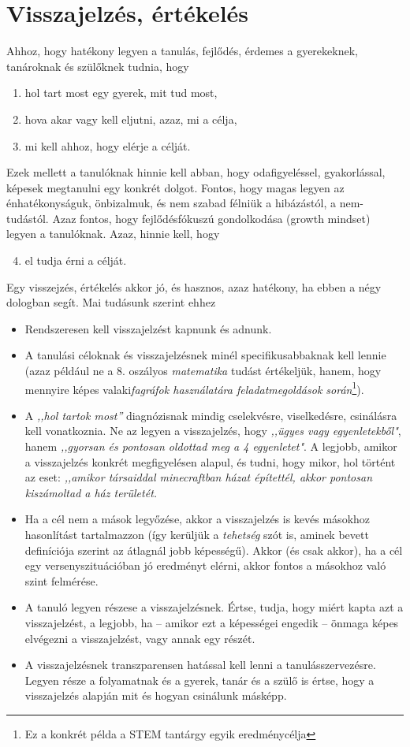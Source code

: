 \section{Visszajelzés, értékelés}
\label{sec:ertekeles}
Ahhoz, hogy hatékony legyen a tanulás, fejlődés, érdemes a gyerekeknek, tanároknak és szülőknek tudnia, hogy
\begin{enumerate}
\item hol tart most egy gyerek, mit tud most,
\item hova akar vagy kell eljutni, azaz, mi a célja,
\item mi kell ahhoz, hogy elérje a célját.
\end{enumerate}
Ezek mellett a tanulóknak hinnie kell abban, hogy odafigyeléssel, gyakorlással, képesek megtanulni egy konkrét dolgot. Fontos, hogy magas legyen az énhatékonyságuk, önbizalmuk, és nem szabad félniük a hibázástól, a nem-tudástól. Azaz fontos, hogy fejlődésfókuszú gondolkodása (growth mindset)\cite{growthmindset} legyen a tanulóknak. Azaz, hinnie kell, hogy
\begin{enumerate}
  \setcounter{enumi}{3}
  \item el tudja érni a célját.
\end{enumerate}

Egy visszejzés, értékelés akkor jó, és hasznos, azaz hatékony, ha ebben a négy dologban segít. Mai tudásunk szerint ehhez
\begin{itemize}
\item Rendszeresen kell visszajelzést kapnunk és adnunk.
\item A tanulási céloknak és visszajelzésnek minél specifikusabbaknak kell lennie (azaz például ne a 8. oszályos \emph{matematika} tudást értékeljük, hanem, hogy mennyire képes valaki\emph{fagráfok használatára feladatmegoldások során}\footnote{Ez a konkrét példa a STEM tantárgy egyik eredménycélja}).
\item A \emph{,,hol tartok most''} diagnózisnak mindig cselekvésre, viselkedésre, csinálásra kell vonatkoznia. Ne az legyen a visszajelzés, hogy \emph{,,ügyes vagy egyenletekből"}, hanem \emph{,,gyorsan és pontosan oldottad meg a 4 egyenletet"}. A legjobb, amikor a visszajelzés konkrét megfigyelésen alapul, és tudni, hogy mikor, hol történt az eset: \emph{,,amikor társaiddal minecraftban házat építettél, akkor pontosan kiszámoltad a ház területét.}
\item Ha a cél nem a mások legyőzése, akkor a visszajelzés is kevés másokhoz hasonlítást tartalmazzon (így kerüljük a \emph{tehetség} szót is, aminek bevett definíciója szerint az átlagnál jobb képességű). Akkor (és csak akkor), ha a cél egy versenyszituációban jó eredményt elérni, akkor fontos a másokhoz való szint felmérése.
\item A tanuló legyen részese a visszajelzésnek. Értse, tudja, hogy miért kapta azt a visszajelzést, a legjobb, ha -- amikor ezt a képességei engedik -- önmaga képes elvégezni a visszajelzést, vagy annak egy részét.
\item A visszajelzésnek transzparensen hatással kell lenni a tanulásszervezésre. Legyen része a folyamatnak és a gyerek, tanár és a szülő is értse, hogy a visszajelzés alapján mit és hogyan csinálunk másképp.
\end{itemize}
